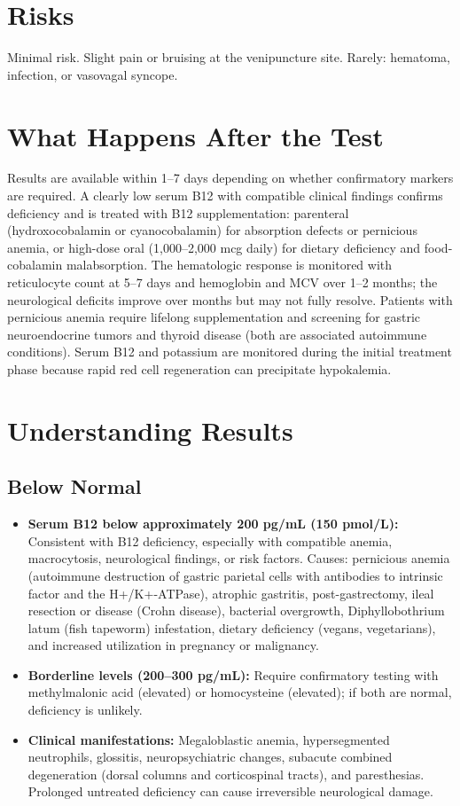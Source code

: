 \section*{Risks}
Minimal risk. Slight pain or bruising at the venipuncture site. Rarely: hematoma, infection, or vasovagal syncope.

\section*{What Happens After the Test}
Results are available within 1--7 days depending on whether confirmatory markers are required. A clearly low serum B12 with compatible clinical findings confirms deficiency and is treated with B12 supplementation: parenteral (hydroxocobalamin or cyanocobalamin) for absorption defects or pernicious anemia, or high-dose oral (1,000--2,000 mcg daily) for dietary deficiency and food-cobalamin malabsorption. The hematologic response is monitored with reticulocyte count at 5--7 days and hemoglobin and MCV over 1--2 months; the neurological deficits improve over months but may not fully resolve. Patients with pernicious anemia require lifelong supplementation and screening for gastric neuroendocrine tumors and thyroid disease (both are associated autoimmune conditions). Serum B12 and potassium are monitored during the initial treatment phase because rapid red cell regeneration can precipitate hypokalemia.

\section*{Understanding Results}

\subsection*{Below Normal}
\begin{itemize}
  \item \textbf{Serum B12 below approximately 200 pg/mL (150 pmol/L):} Consistent with B12 deficiency, especially with compatible anemia, macrocytosis, neurological findings, or risk factors. Causes: pernicious anemia (autoimmune destruction of gastric parietal cells with antibodies to intrinsic factor and the H+/K+-ATPase), atrophic gastritis, post-gastrectomy, ileal resection or disease (Crohn disease), bacterial overgrowth, Diphyllobothrium latum (fish tapeworm) infestation, dietary deficiency (vegans, vegetarians), and increased utilization in pregnancy or malignancy.
  \item \textbf{Borderline levels (200--300 pg/mL):} Require confirmatory testing with methylmalonic acid (elevated) or homocysteine (elevated); if both are normal, deficiency is unlikely.
  \item \textbf{Clinical manifestations:} Megaloblastic anemia, hypersegmented neutrophils, glossitis, neuropsychiatric changes, subacute combined degeneration (dorsal columns and corticospinal tracts), and paresthesias. Prolonged untreated deficiency can cause irreversible neurological damage.
\end{itemize}

